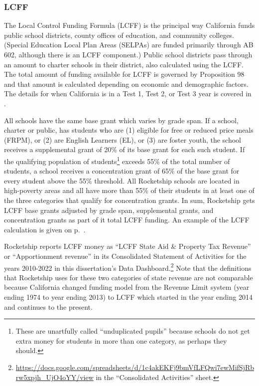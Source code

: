 \subsubsection{LCFF}%
\label{sec:lcff}\indent%

The Local Control Funding Formula (LCFF) is the principal way California funds public school districts, county offices of education, and community colleges. (Special Education Local Plan Areas (SELPAs) are funded primarily through AB 602, although there is an LCFF component.) Public school districts pass through an amount to charter schools in their district, also calculated using the LCFF. The total amount of funding available for LCFF is governed by Proposition 98 and that amount is calculated depending on economic and demographic factors. The details for when California is in a Test 1, Test 2, or Test 3 year is covered in \textcite[17–21]{Aguinaldo.etal2023}.

All schools have the same base grant which varies by grade span. If a school, charter or public, has students who are (1) eligible for free or reduced price meals (FRPM), or (2) are English Learners (EL), or (3) are foster youth, the school receives a supplemental grant of 20\% of its base grant for each such student. If the qualifying population of students\footnote{These are unartfully called ``unduplicated pupils'' because schools do not get extra money for students in more than one category, as perhaps they should.} exceeds 55\% of the total number of students, a school receives a concentration grant of 65\% of the base grant for every student above the 55\% threshold. All Rocketship schools are located in high-poverty areas and all have more than 55\% of their students in at least one of the three categories that qualify for concentration grants. In sum, Rocketship gets LCFF base grants adjusted by grade span, supplemental grants, and concentration grants as part of it total LCFF funding. An example of the LCFF calculation is given on p.~\pageref{example_LCFF_calculation}.

Rocketship reports LCFF money as ``LCFF State Aid \& Property Tax Revenue'' or ``Apportionment revenue'' in its Consolidated Statement of Activities for the years 2010-2022 in this dissertation's Data Dashboard.\footnote{\url{https://docs.google.com/spreadsheets/d/1c4akEKFj9bmVfLFQwi7ewMifSjRbrw5xpjh_UjO4oYY/view} in the ``Consolidated Activities'' sheet.} Note that the definitions that Rocketship uses for these two categories of state revenue are not comparable because California changed funding model from the Revenue Limit system (year ending 1974 to year ending 2013) to LCFF which started in the year ending 2014 and continues to the present.

